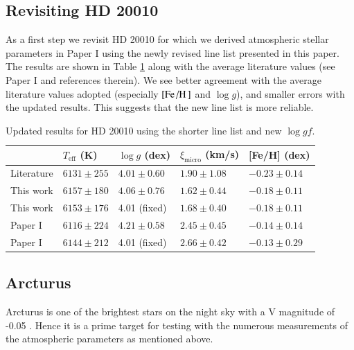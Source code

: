 \documentclass{aa}
\begin{document}
\subsection{Revisiting HD 20010}
\label{sec:hd20010}

As a first step we revisit HD 20010 for which we derived atmospheric stellar
parameters in Paper I using the newly revised line list presented in this paper.
The results are shown in Table \ref{tab:hd20010} along with the average
literature values (see Paper I and references therein). We see better agreement
with the average literature values adopted (especially $[\ion{Fe}/\ion{H}]$ and
$\log g$), and smaller errors with the updated results. This suggests that the
new line list is more reliable.

\begin{table}[htb!]
    \caption{Updated results for HD 20010 using the shorter line list and new
             $\log \mathit{gf}$.}
    \label{tab:hd20010}
    \centering
    \begin{tabular}{lllll}
      \hline\hline
                      & $T_\mathrm{eff}$ (K) &  $\log g$ (dex)  &   $\xi_\mathrm{micro}$ (km/s)   & [Fe/H] (dex)     \\
      \hline
        Literature    & $6131 \pm 255$       &  $4.01 \pm 0.60$ &    $1.90 \pm 1.08$              & $-0.23 \pm 0.14$ \\
      \hline
        This work     & $6157 \pm 180$       &  $4.06 \pm 0.76$ &    $1.62 \pm 0.44$              & $-0.18 \pm 0.11$ \\
        This work     & $6153 \pm 176$       &   4.01 (fixed)   &    $1.68 \pm 0.40$              & $-0.18 \pm 0.11$ \\
      \hline
        Paper I       & $6116 \pm 224$       &  $4.21 \pm 0.58$ &    $2.45 \pm 0.45$              & $-0.14 \pm 0.14$ \\
        Paper I       & $6144 \pm 212$       &   4.01 (fixed)   &    $2.66 \pm 0.42$              & $-0.13 \pm 0.29$ \\
      \hline
    \end{tabular}
\end{table}




\subsection{Arcturus}
\label{sec:arcturus}

Arcturus is one of the brightest stars on the night sky with a V magnitude of
-0.05 \citep{Ducati2002}. Hence it is a prime target for testing with the
numerous measurements of the atmospheric parameters as mentioned above.
\end{document}
